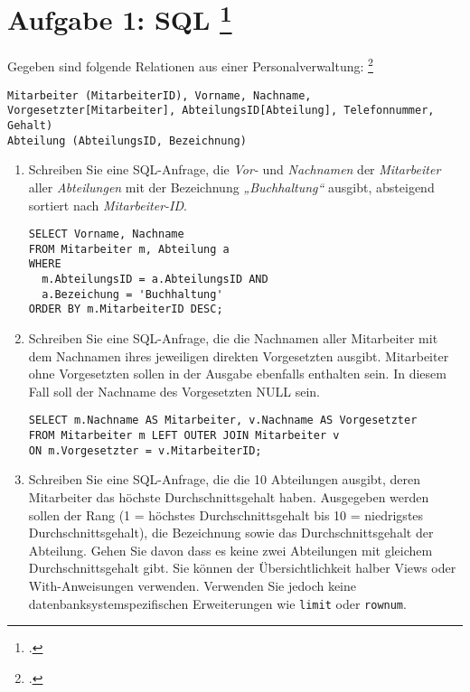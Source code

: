 \documentclass{lehramt-informatik-minimal}
\begin{document}
\section{Aufgabe 1: SQL
\footcite[Thema 1 Teilaufgabe 1 Aufgabe 4]{examen:66116:2016:09}}

Gegeben sind folgende Relationen aus einer Personalverwaltung:
\footcite{db:pu:3}

\begin{verbatim}
Mitarbeiter (MitarbeiterID), Vorname, Nachname, Vorgesetzter[Mitarbeiter], AbteilungsID[Abteilung], Telefonnummer, Gehalt)
Abteilung (AbteilungsID, Bezeichnung)
\end{verbatim}

\begin{enumerate}


\item Schreiben Sie eine SQL-Anfrage, die \emph{Vor-} und
\emph{Nachnamen} der \emph{Mitarbeiter} aller \emph{Abteilungen} mit der
Bezeichnung \emph{„Buchhaltung“} ausgibt, absteigend sortiert nach
\emph{Mitarbeiter-ID}.

\begin{antwort}
\begin{verbatim}
SELECT Vorname, Nachname
FROM Mitarbeiter m, Abteilung a
WHERE
  m.AbteilungsID = a.AbteilungsID AND
  a.Bezeichung = 'Buchhaltung'
ORDER BY m.MitarbeiterID DESC;
\end{verbatim}
\end{antwort}


\item Schreiben Sie eine SQL-Anfrage, die die Nachnamen aller
Mitarbeiter mit dem Nachnamen ihres jeweiligen direkten Vorgesetzten
ausgibt. Mitarbeiter ohne Vorgesetzten sollen in der Ausgabe ebenfalls
enthalten sein. In diesem Fall soll der Nachname des Vorgesetzten NULL
sein.

\begin{antwort}
\begin{verbatim}
SELECT m.Nachname AS Mitarbeiter, v.Nachname AS Vorgesetzter
FROM Mitarbeiter m LEFT OUTER JOIN Mitarbeiter v
ON m.Vorgesetzter = v.MitarbeiterID;
\end{verbatim}
\end{antwort}


\item Schreiben Sie eine SQL-Anfrage, die die 10 Abteilungen ausgibt,
deren Mitarbeiter das höchste Durchschnittsgehalt haben. Ausgegeben
werden sollen der Rang (1 = höchstes Durchschnittsgehalt bis 10 =
niedrigstes Durchschnittsgehalt), die Bezeichnung sowie das
Durchschnittsgehalt der Abteilung. Gehen Sie davon dass es keine zwei
Abteilungen mit gleichem Durchschnittsgehalt gibt. Sie können der
Übersichtlichkeit halber Views oder With-Anweisungen verwenden.
Verwenden Sie jedoch keine datenbanksystemspezifischen Erweiterungen wie
\verb|limit| oder \verb|rownum|.


\end{enumerate}
\end{document}
